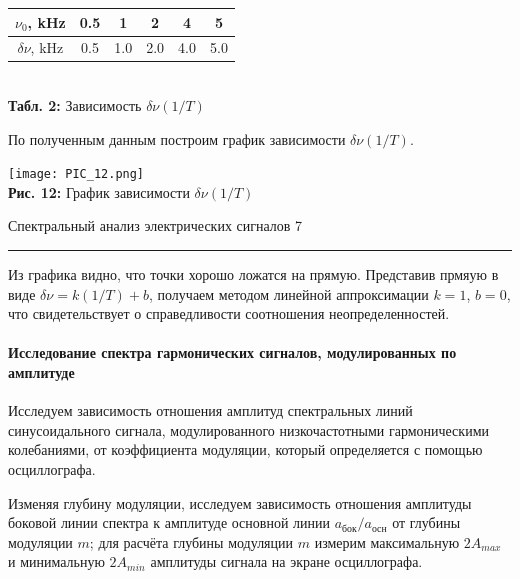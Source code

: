 \documentclass[12pt,a4paper]{scrartcl}
\begin{document}
	\begin{center}
		\begin{tabular}{|c|c|c|c|c|c|}
			\hline
			$\nu_0$, kHz & 0.5 & 1 & 2 & 4 & 5
			\\\hline
			$\delta \nu$, kHz & 0.5 & 1.0 & 2.0 & 4.0 & 5.0
			\\\hline
		\end{tabular}
		\\\textbf{Табл. 2:} Зависимость $\delta \nu (1/T)$
	\end{center}
	
	По полученным данным построим график зависимости $\delta\nu(1/T)$.
	
		\begin{center}
		\texttt{[image: PIC\_12.png]}
		\\\textbf{Рис. 12:} График зависимости $\delta\nu(1/T)$
	\end{center}
	
	\newpage
	
	
	\begin{flushleft}
		\footnotesize{Спектральный анализ электрических сигналов} \hspace{\fill} \footnotesize{7}
		\\[-0.3cm]\noindent\rule{\textwidth}{0.3pt}
	\end{flushleft}
	
	 Из графика видно, что точки хорошо ложатся на прямую. Представив прмяую в виде $\delta\nu = k(1/T) + b$, получаем методом линейной аппроксимации $k = 1$, $b = 0$, что свидетельствует о справедливости соотношения неопределенностей.
	
	
	\paragraph{Исследование спектра гармонических сигналов, модулированных по амплитуде} \hfill
	
	Исследуем зависимость отношения амплитуд спектральных линий синусоидального сигнала, модулированного низкочастотными гармоническими колебаниями,	от коэффициента модуляции, который определяется с помощью осциллографа.
	
	Изменяя глубину модуляции, исследуем зависимость отношения амплитуды боковой линии спектра к амплитуде основной линии $a_{\text{бок}} / a_{\text{осн}}$ от глубины модуляции $m$; для расчёта глубины модуляции $m$ измерим максимальную $2A_{max}$ и минимальную $2A_{min}$ амплитуды сигнала на экране осциллографа.
	
\end{document}
